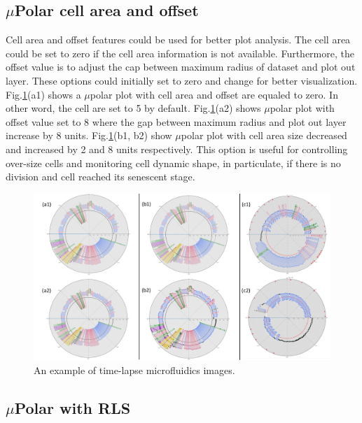 \documentclass[conference]{IEEEtran}
\begin{document}
\subsection{$\mu$Polar cell area and offset}

Cell area and offset features could be used for better plot analysis. The cell area could be set to zero if the cell area information is not available. Furthermore, the offset value is to adjust the cap between maximum radius of dataset and plot out layer. These options could initially set to zero and change for better visualization. Fig.\ref{fig:areaoff}(a1) shows a $\mu$polar plot with cell area and offset are equaled to zero. In other word, the cell are set to 5 by default. Fig.\ref{fig:areaoff}(a2) shows $\mu$polar plot with offset value set to 8 where the gap between maximum radius and plot out layer increase by 8 units. Fig.\ref{fig:areaoff}(b1, b2) show $\mu$polar plot with cell area size decreased and increased by 2 and 8 units respectively. This option is useful for controlling over-size cells and monitoring cell dynamic shape, in particulate, if there is no division and cell reached its senescent stage.    

\begin{figure}
\centering
\includegraphics[width=\textwidth,height=10 cm]{Patterns/area_offset.pdf}
\caption{ An example of time-lapse microfluidics images.}
\label{fig:areaoff}
\end{figure}


\subsection{$\mu$Polar with RLS}
\end{document}
